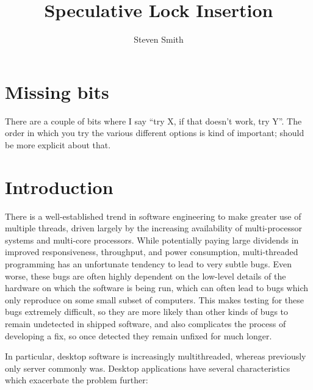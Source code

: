 \documentclass[10pt,a4paper,twocolumn]{article}
\title{Speculative Lock Insertion}
\author{Steven Smith}
\begin{document}
\newcommand{\editorial}[1]{\textcolor{red}{\footnote{\textcolor{red}{#1}}}}
\newcommand{\needCite}{\editorial{need cite}}
\maketitle

\section{Missing bits}

There are a couple of bits where I say ``try X, if that doesn't work,
try Y''.  The order in which you try the various different options is
kind of important; should be more explicit about that.

\section{Introduction}

There is a well-established trend in software engineering to make
greater use of multiple threads, driven largely by the increasing
availability of multi-processor systems and multi-core processors.
While potentially paying large dividends in improved responsiveness,
throughput, and power consumption, multi-threaded programming has an
unfortunate tendency to lead to very subtle bugs.  Even worse, these
bugs are often highly dependent on the low-level details of the
hardware on which the software is being run, which can often lead to
bugs which only reproduce on some small subset of computers.  This
makes testing for these bugs extremely difficult, so they are more
likely than other kinds of bugs to remain undetected in shipped
software, and also complicates the process of developing a fix, so
once detected they remain unfixed for much longer.

In particular, desktop software is increasingly multithreaded, whereas
previously only server commonly was.  Desktop applications have
several characteristics which exacerbate the problem further:
\end{document}

